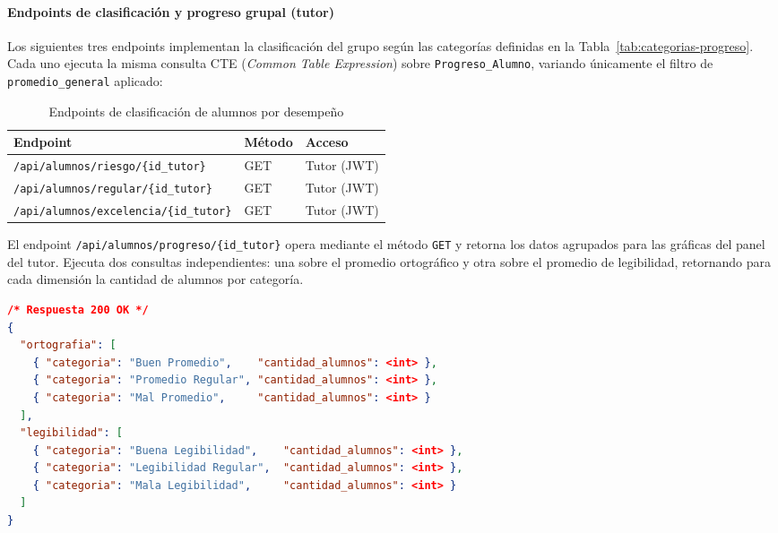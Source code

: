 \paragraph{Endpoints de clasificación y progreso grupal (tutor)}

Los siguientes tres endpoints implementan la clasificación del grupo
según las categorías definidas en la Tabla~\ref{tab:categorias-progreso}.
Cada uno ejecuta la misma consulta CTE (\textit{Common Table Expression})
sobre \texttt{Progreso\_Alumno}, variando únicamente el filtro de
\texttt{promedio\_general} aplicado:

\begin{table}[H]
\centering
\caption{Endpoints de clasificación de alumnos por desempeño}
\label{tab:endpoints-clasificacion}
\begin{tabular}{|l|l|l|}
\hline
\textbf{Endpoint} & \textbf{Método} & \textbf{Acceso} \\
\hline
\texttt{/api/alumnos/riesgo/\{id\_tutor\}}      & GET & Tutor (JWT) \\
\texttt{/api/alumnos/regular/\{id\_tutor\}}     & GET & Tutor (JWT) \\
\texttt{/api/alumnos/excelencia/\{id\_tutor\}}  & GET & Tutor (JWT) \\
\hline
\end{tabular}
\end{table}

El endpoint \texttt{/api/alumnos/progreso/\{id\_tutor\}} opera mediante
el método \texttt{GET} y retorna los datos agrupados para las gráficas
del panel del tutor. Ejecuta dos consultas independientes: una sobre
el promedio ortográfico y otra sobre el promedio de legibilidad,
retornando para cada dimensión la cantidad de alumnos por categoría.

\begin{lstlisting}[language=json, caption={Estructura de respuesta del endpoint de progreso gráfico}, label={lst:progreso-response}]
/* Respuesta 200 OK */
{
  "ortografia": [
    { "categoria": "Buen Promedio",    "cantidad_alumnos": <int> },
    { "categoria": "Promedio Regular", "cantidad_alumnos": <int> },
    { "categoria": "Mal Promedio",     "cantidad_alumnos": <int> }
  ],
  "legibilidad": [
    { "categoria": "Buena Legibilidad",    "cantidad_alumnos": <int> },
    { "categoria": "Legibilidad Regular",  "cantidad_alumnos": <int> },
    { "categoria": "Mala Legibilidad",     "cantidad_alumnos": <int> }
  ]
}
\end{lstlisting}

